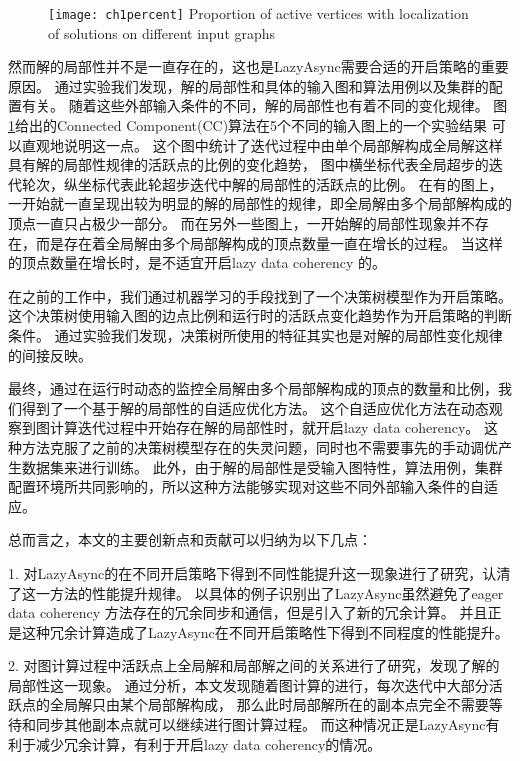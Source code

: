 \begin{figure}[!htbp]
  \centering
  \texttt{[image: ch1percent]}
  { Proportion of active vertices with localization of solutions on different input graphs}
  \label{fig:ch1percent}
\end{figure}

然而解的局部性并不是一直存在的，这也是LazyAsync需要合适的开启策略的重要原因。
通过实验我们发现，解的局部性和具体的输入图和算法用例以及集群的配置有关。
随着这些外部输入条件的不同，解的局部性也有着不同的变化规律。
图\ref{fig:ch1percent}给出的Connected Component(CC)算法在5个不同的输入图上的一个实验结果
可以直观地说明这一点。
这个图中统计了迭代过程中由单个局部解构成全局解这样具有解的局部性规律的活跃点的比例的变化趋势，
图中横坐标代表全局超步的迭代轮次，纵坐标代表此轮超步迭代中解的局部性的活跃点的比例。
在有的图上，一开始就一直呈现出较为明显的解的局部性的规律，即全局解由多个局部解构成的顶点一直只占极少一部分。
而在另外一些图上，一开始解的局部性现象并不存在，而是存在着全局解由多个局部解构成的顶点数量一直在增长的过程。
当这样的顶点数量在增长时，是不适宜开启lazy data coherency 的。

在之前的工作中，我们通过机器学习的手段找到了一个决策树模型作为开启策略。
这个决策树使用输入图的边点比例和运行时的活跃点变化趋势作为开启策略的判断条件。
通过实验我们发现，决策树所使用的特征其实也是对解的局部性变化规律的间接反映。

最终，通过在运行时动态的监控全局解由多个局部解构成的顶点的数量和比例，我们得到了一个基于解的局部性的自适应优化方法。
这个自适应优化方法在动态观察到图计算迭代过程中开始存在解的局部性时，就开启lazy data coherency。
这种方法克服了之前的决策树模型存在的失灵问题，同时也不需要事先的手动调优产生数据集来进行训练。
此外，由于解的局部性是受输入图特性，算法用例，集群配置环境所共同影响的，所以这种方法能够实现对这些不同外部输入条件的自适应。

总而言之，本文的主要创新点和贡献可以归纳为以下几点：

1. 对LazyAsync的在不同开启策略下得到不同性能提升这一现象进行了研究，认清了这一方法的性能提升规律。
以具体的例子识别出了LazyAsync虽然避免了eager data coherency 方法存在的冗余同步和通信，但是引入了新的冗余计算。
并且正是这种冗余计算造成了LazyAsync在不同开启策略性下得到不同程度的性能提升。

2. 对图计算过程中活跃点上全局解和局部解之间的关系进行了研究，发现了解的局部性这一现象。
通过分析，本文发现随着图计算的进行，每次迭代中大部分活跃点的全局解只由某个局部解构成，
那么此时局部解所在的副本点完全不需要等待和同步其他副本点就可以继续进行图计算过程。
而这种情况正是LazyAsync有利于减少冗余计算，有利于开启lazy data coherency的情况。

